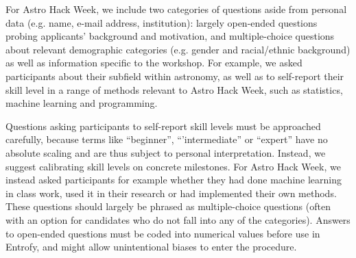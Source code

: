 \documentclass[12pt]{article}
\begin{document}
For Astro Hack Week, we include two categories of questions aside from personal data (e.g. name, e-mail address, institution): largely open-ended questions probing applicants' background and motivation, and multiple-choice questions about relevant demographic categories (e.g. gender and racial/ethnic background) as well as information specific to the workshop. For example, we asked participants about their subfield within astronomy, as well as to self-report their skill level in a range of methods relevant to Astro Hack Week, such as statistics, machine learning and programming. 

Questions asking participants to self-report skill levels must be approached carefully, because terms like ``beginner'', ``'intermediate'' or ``expert'' have no absolute scaling and are thus subject to personal interpretation. Instead, we suggest calibrating skill levels on concrete milestones. For Astro Hack Week, we instead asked participants for example whether they had done machine learning in class work, used it in their research or had implemented their own methods. These questions should largely be phrased as multiple-choice questions (often with an option for candidates who do not fall into any of the categories). Answers to open-ended questions must be coded into numerical values before use in Entrofy, and might allow unintentional biases to enter the procedure.
\end{document}
